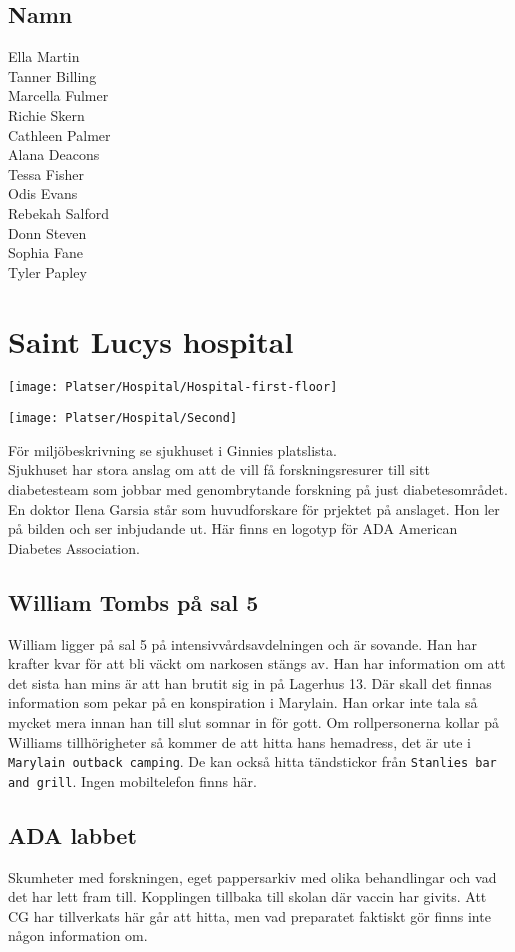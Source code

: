 \documentclass[a5paper,10pt]{report}
\begin{document}
\subsection{Namn}
Ella Martin\\
Tanner Billing\\
Marcella Fulmer\\
Richie Skern\\
Cathleen Palmer\\
Alana Deacons\\
Tessa Fisher\\
Odis Evans\\
Rebekah Salford\\
Donn Steven\\
Sophia Fane\\
Tyler Papley
\section{Saint Lucys hospital}
\texttt{[image: Platser/Hospital/Hospital-first-floor]}

\texttt{[image: Platser/Hospital/Second]}

För miljöbeskrivning se sjukhuset i Ginnies platslista.\\
Sjukhuset har stora anslag om att de vill få forskningsresurer till sitt diabetesteam som jobbar med genombrytande forskning på just diabetesområdet. En doktor Ilena Garsia står som huvudforskare för prjektet på anslaget. Hon ler på bilden och ser inbjudande ut. Här finns en logotyp för ADA American Diabetes Association.
\subsection{William Tombs på sal 5}
William ligger på sal 5 på intensivvårdsavdelningen och är sovande. Han har krafter kvar för att bli väckt om narkosen stängs av. Han har information om att det sista han mins är att han brutit sig in på Lagerhus 13. Där skall det finnas information som pekar på en konspiration i Marylain. Han orkar inte tala så mycket mera innan han till slut somnar in för gott. Om rollpersonerna kollar på Williams tillhörigheter så kommer de att hitta hans hemadress, det är ute i \texttt{Marylain outback camping}. De kan också hitta tändstickor från \texttt{Stanlies bar and grill}. Ingen mobiltelefon finns här.
\subsection{ADA labbet}
Skumheter med forskningen, eget pappersarkiv med olika behandlingar och vad det har lett fram till. Kopplingen tillbaka till skolan där vaccin har givits. Att CG har tillverkats här går att hitta, men vad preparatet faktiskt gör finns inte någon information om.
\end{document}
